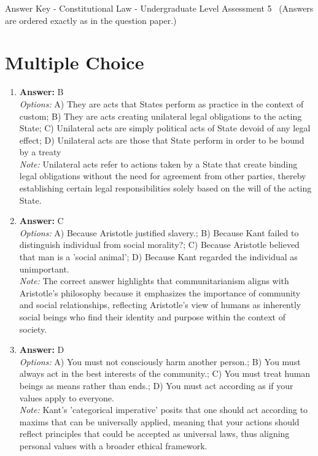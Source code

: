 \documentclass[12pt]{article}
\begin{document}
\begin{center}
Answer Key - Constitutional Law - Undergraduate Level Assessment 5 \
\small (Answers are ordered exactly as in the question paper.)
\end{center}

\section*{Multiple Choice}
\begin{enumerate}[label=\arabic*.]
\item \textbf{Answer:} B
\\ \textit{Options:} A) They are acts that States perform as practice in the context of custom; B) They are acts creating unilateral legal obligations to the acting State; C) Unilateral acts are simply political acts of State devoid of any legal effect; D) Unilateral acts are those that State perform in order to be bound by a treaty
\\ \textit{Note:} Unilateral acts refer to actions taken by a State that create binding legal obligations without the need for agreement from other parties, thereby establishing certain legal responsibilities solely based on the will of the acting State.
\item \textbf{Answer:} C
\\ \textit{Options:} A) Because Aristotle justified slavery.; B) Because Kant failed to distinguish individual from social morality?; C) Because Aristotle believed that man is a 'social animal'; D) Because Kant regarded the individual as unimportant.
\\ \textit{Note:} The correct answer highlights that communitarianism aligns with Aristotle's philosophy because it emphasizes the importance of community and social relationships, reflecting Aristotle's view of humans as inherently social beings who find their identity and purpose within the context of society.
\item \textbf{Answer:} D
\\ \textit{Options:} A) You must not consciously harm another person.; B) You must always act in the best interests of the community.; C) You must treat human beings as means rather than ends.; D) You must act according as if your values apply to everyone.
\\ \textit{Note:} Kant's 'categorical imperative' posits that one should act according to maxims that can be universally applied, meaning that your actions should reflect principles that could be accepted as universal laws, thus aligning personal values with a broader ethical framework.

\end{enumerate}
\end{document}
